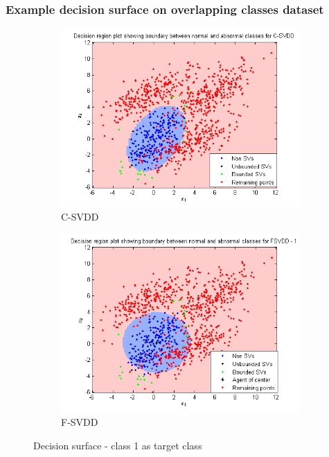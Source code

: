 \documentclass{beamer}
\begin{document}
\begin{frame}
\frametitle{Example decision surface on overlapping classes dataset}

\begin{figure}[H]
\begin{subfigure}{.5\textwidth}
  \centering
  \includegraphics[width=\linewidth]{decn_over_1}
\caption{C-SVDD} 
\end{subfigure}%
\begin{subfigure}{.5\textwidth}
  \centering
  \includegraphics[width=\linewidth]{decn_over_2}
\caption{F-SVDD} 
\end{subfigure}
\caption{Decision surface - class 1 as target class} 
\end{figure}




\end{frame}
\end{document}

